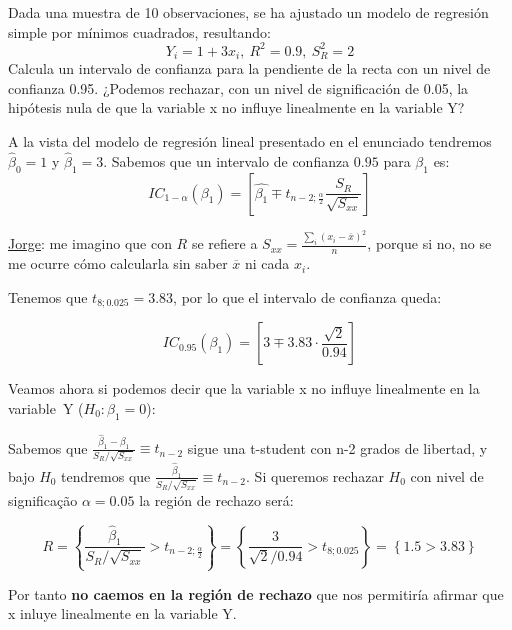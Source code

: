 \begin{problem}[2]
Dada una muestra de 10 observaciones, se ha ajustado un modelo de regresión simple por mínimos cuadrados, resultando:
  \[Y_i =1+3x_i,\ R^2 =0.9,\ S_R^2 =2\]
Calcula un intervalo de confianza para la pendiente de la recta con un nivel de confianza 0.95. ¿Podemos rechazar, con un nivel de significación de 0.05, la hipótesis nula de que la variable x no influye linealmente en la variable Y?

\solution 
{}

A la vista del modelo de regresión lineal presentado en el enunciado tendremos $\hat{β}_0=1$ y $\hat{β}_1=3$. Sabemos que un intervalo de confianza $0.95$ para $β_1$ es:
\[IC_{1-α}(β_1) = \left[ \hat{β_1} \mp t_{n-2;\frac{α}{2}} \frac{S_R}{\sqrt{S_{xx}}} \right]\]

{\color{gray} \underline{Jorge}: me imagino que con $R$ se refiere a $S_{xx} = \frac{\sum_i (x_i - \overline{x})^2}{n}$, porque si no, no se me ocurre cómo calcularla sin saber $\overline{x}$ ni cada $x_i$}.

Tenemos que $t_{8;0.025} = 3.83$, por lo que el intervalo de confianza queda:

\[IC_{0.95}(β_1) = \left[ 3 \mp 3.83 · \frac{\sqrt{2}}{0.94} \right]\]

Veamos ahora si podemos decir que la variable x no influye linealmente en la variable~Y ($H_0: β_1=0$):

Sabemos que $\frac{\hat{β}_1 - β_1}{S_R / \sqrt{S_{xx}}} \equiv t_{n-2}$ sigue una t-student con n-2 grados de libertad, y bajo $H_0$ tendremos que $\frac{\hat{β}_1 }{S_R / \sqrt{S_{xx}}} \equiv t_{n-2}$. Si queremos rechazar $H_0$ con nivel de significação $α=0.05$ la región de rechazo será:

\[R = \left\{ \frac{\hat{β}_1 }{S_R / \sqrt{S_{xx}}} > t_{n-2;\frac{α}{2}} \right\} = \left\{ \frac{3}{\sqrt{2} / 0.94} > t_{8;0.025} \right\} = \left\{ 1.5 > 3.83 \right\}\]

Por tanto \textbf{no caemos en la región de rechazo} que nos permitiría afirmar que x inluye linealmente en la variable Y.

\end{problem}


